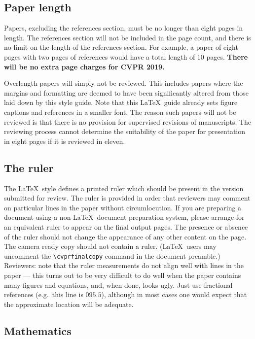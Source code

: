 \documentclass[10pt,twocolumn,letterpaper]{article}
\begin{document}
\subsection{Paper length}
Papers, excluding the references section,
must be no longer than eight pages in length. The references section
will not be included in the page count, and there is no limit on the
length of the references section. For example, a paper of eight pages
with two pages of references would have a total length of 10 pages.
{\bf There will be no extra page charges for CVPR 2019.}

Overlength papers will simply not be reviewed.  This includes papers
where the margins and formatting are deemed to have been significantly
altered from those laid down by this style guide.  Note that this
\LaTeX\ guide already sets figure captions and references in a smaller font.
The reason such papers will not be reviewed is that there is no provision for
supervised revisions of manuscripts.  The reviewing process cannot determine
the suitability of the paper for presentation in eight pages if it is
reviewed in eleven.  

\subsection{The ruler}
The \LaTeX\ style defines a printed ruler which should be present in the
version submitted for review.  The ruler is provided in order that
reviewers may comment on particular lines in the paper without
circumlocution.  If you are preparing a document using a non-\LaTeX\
document preparation system, please arrange for an equivalent ruler to
appear on the final output pages.  The presence or absence of the ruler
should not change the appearance of any other content on the page.  The
camera ready copy should not contain a ruler. (\LaTeX\ users may uncomment
the \verb'\cvprfinalcopy' command in the document preamble.)  Reviewers:
note that the ruler measurements do not align well with lines in the paper
--- this turns out to be very difficult to do well when the paper contains
many figures and equations, and, when done, looks ugly.  Just use fractional
references (e.g.\ this line is $095.5$), although in most cases one would
expect that the approximate location will be adequate.

\subsection{Mathematics}
\end{document}
